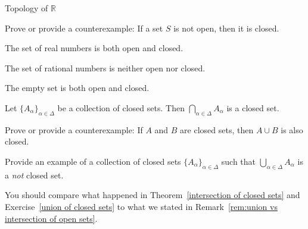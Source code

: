 \begin{section}{Topology of $\mathbb{R}$}
\begin{problem}
Prove or provide a counterexample: If a set $S$ is not open, then it is closed.
\end{problem}

\begin{theorem}
The set of real numbers is both open and closed.
\end{theorem}

\begin{theorem}
The set of rational numbers is neither open nor closed.
\end{theorem}

\begin{theorem}
The empty set is both open and closed.
\end{theorem}

\begin{theorem}\label{intersection of closed sets}
Let $\{A_{\alpha}\}_{\alpha\in\Delta}$ be a collection of closed sets.  Then $\bigcap_{\alpha\in \Delta} A_{\alpha}$ is a closed set.
\end{theorem}

\begin{problem}
Prove or provide a counterexample: If $A$ and $B$ are closed sets, then $A\cup B$ is also closed.
\end{problem}

\begin{exercise}\label{union of closed sets}
Provide an example of a collection of closed sets $\{A_{\alpha}\}_{\alpha\in\Delta}$ such that $\bigcup_{\alpha\in \Delta} A_{\alpha}$ is a \emph{not} closed set.
\end{exercise}

\begin{remark}
You should compare what happened in Theorem~\ref{intersection of closed sets} and Exercise~\ref{union of closed sets} to what we stated in Remark~\ref{rem:union vs intersection of open sets}.
\end{remark}

\end{section}